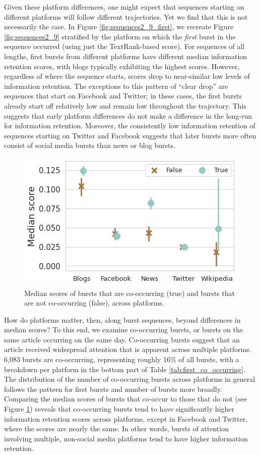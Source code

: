 \documentclass[letterpaper]{article} %
\begin{document}
Given these platform differences, one might expect that sequences starting on different platforms will follow different trajectories. Yet we find that this is not necessarily the case. In Figure \ref{fig:sequences2_9_first}, we recreate Figure \ref{fig:sequences2_9} stratified by the platform on which the \textit{first} burst in the sequence occurred (using just the TextRank-based score). For sequences of all lengths, first bursts from different platforms have different median information retention scores, with blogs typically exhibiting the highest scores. However, regardless of where the sequence starts, scores drop to near-similar low levels of information retention. The exceptions to this pattern of ``clear drop'' are sequences that start on Facebook and Twitter; in these cases, the first bursts already start off relatively low and remain low throughout the trajectory.
This suggests that early platform differences do not make a difference in the long-run for information retention. Moreover, the consistently low information retention of sequences starting on Twitter and Facebook suggests that later bursts more often consist of social media bursts than news or blog bursts.

\begin{figure}[t]
\centering
\includegraphics[width=0.8\columnwidth]{figs/fig6.png}
\caption{Median scores of bursts that are co-occurring (true) and bursts that are not co-occurring (false), across platforms.}
\label{fig:co_occurring}
\end{figure}

How do platforms matter, then, along burst sequences, beyond differences in median scores?
To this end, we examine co-occurring bursts, or bursts on the same article occurring on the same day. Co-occurring bursts suggest that an article received widespread attention that is apparent across multiple platforms. 6,083 bursts are co-occurring, representing roughly 16\% of all bursts, with a breakdown per platform in the bottom part of Table \ref{tab:first_co_occurring}. The distribution of the number of co-occurring bursts across platforms in general follows the pattern for first bursts and number of bursts more broadly.
Comparing the median scores of bursts that co-occur to those that do not (see Figure \ref{fig:co_occurring}) reveals that co-occurring bursts tend to have significantly higher information retention scores across platforms, except in Facebook and Twitter, where the scores are nearly the same. In other words, bursts of attention involving multiple, non-social media platforms tend to have higher information retention.
\end{document}
